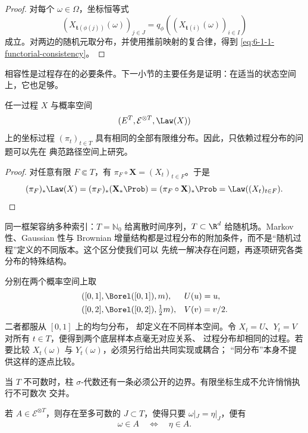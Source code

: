 \begin{proof}
对每个 $\omega\in\Omega$，坐标恒等式
\[
 (X_{\mathbf t(\phi(j))}(\omega))_{j\in J}
 =q_\phi((X_{\mathbf t(i)}(\omega))_{i\in I})
\]
成立。对两边的随机元取分布，并使用推前映射的复合律，得到
\eqref{eq:6-1-1-functorial-consistency}。
\end{proof}

相容性是过程存在的必要条件。下一小节的主要任务是证明：在适当的状态空间上，它也足够。

\begin{proposition}[典范实现]\label{proposition:6-1-1-4}
任一过程 $X$ 与概率空间
\[
  (E^T,\mathcal E^{\otimes T},\Law(X))
\]
上的坐标过程 $(\pi_t)_{t\in T}$ 具有相同的全部有限维分布。因此，只依赖过程分布的问题可以先在
典范路径空间上研究。
\end{proposition}

\begin{proof}
对任意有限 $F\Subset T$，有 $\pi_F\circ\mathbf X=(X_t)_{t\in F}$。于是
\[
 (\pi_F)_*\Law(X)
 =(\pi_F)_*(\mathbf X_*\Prob)
 =(\pi_F\circ\mathbf X)_*\Prob
 =\Law((X_t)_{t\in F}).
\]
\end{proof}

同一框架容纳多种索引：$T=\mathbb N_0$ 给离散时间序列，$T\subset\R^d$ 给随机场。Markov 性、Gaussian 性与
Brownian 增量结构都是过程分布的附加条件，而不是“随机过程”定义的不同版本。这个区分使我们可以
先统一解决存在问题，再逐项研究各类分布的特殊结构。

\begin{example}[同一分布的不同实现]\label{ex:6-1-1-3}
分别在两个概率空间上取
\[
 \begin{aligned}
 &([0,1],\Borel([0,1]),m), &&U(u)=u,\\
 &([0,2],\Borel([0,2]),\tfrac12m), &&V(v)=v/2.
 \end{aligned}
\]
二者都服从 $[0,1]$ 上的均匀分布，
却定义在不同样本空间。令 $X_t=U$、$Y_t=V$ 对所有 $t\in T$，便得到两个底层样本点毫无对应关系、
过程分布却相同的过程。若要比较 $X_t(\omega)$ 与 $Y_t(\omega)$，必须另行给出共同实现或耦合；
“同分布”本身不提供这样的逐点比较。
\end{example}

当 $T$ 不可数时，柱 $\sigma$-代数还有一条必须公开的边界。有限坐标生成不允许悄悄执行不可数次
交并。

\begin{proposition}[柱事件只依赖可数多个坐标]\label{proposition:6-1-1-countable-support}
若 $A\in\mathcal E^{\otimes T}$，则存在至多可数的 $J\subset T$，使得只要
$\omega|_J=\eta|_J$，便有
\[
  \omega\in A\quad\Longleftrightarrow\quad\eta\in A.
\]
\end{proposition}

